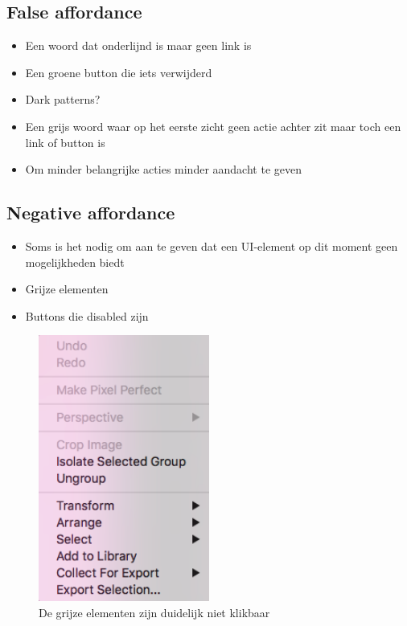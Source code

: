 \documentclass{article}
\begin{document}
\subsection{False affordance}
\begin{itemize}
    \item Een woord dat onderlijnd is maar geen link is
    \item Een groene button die iets verwijderd
    \item Dark patterns?
    \item Een grijs woord waar op het eerste zicht geen actie achter zit maar toch een link of button is
    \item Om minder belangrijke acties minder aandacht te geven
\end{itemize}

\subsection{Negative affordance}

\begin{itemize}
    \item Soms is het nodig om aan te geven dat een UI-element op dit moment geen mogelijkheden biedt
    \item Grijze elementen
    \item Buttons die disabled zijn
\end{itemize}

\begin{figure}[H]
    \centering
    \includegraphics[width=0.5\textwidth]{negative-affordance.png}
    \caption{De grijze elementen zijn duidelijk niet klikbaar}
\end{figure}
\end{document}
